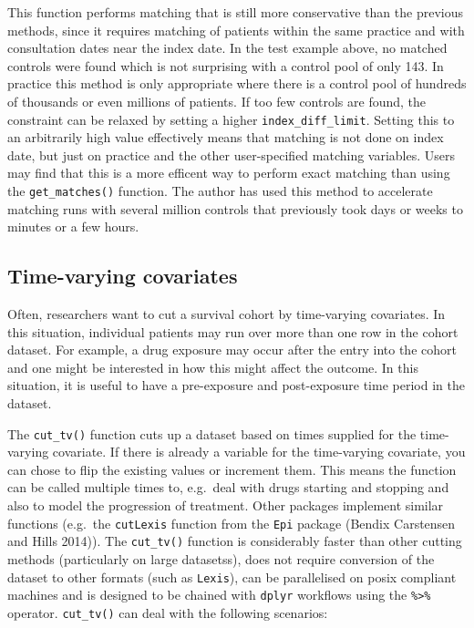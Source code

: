 \documentclass[]{article}
\begin{document}
This function performs matching that is still more conservative than the
previous methods, since it requires matching of patients within the same
practice and with consultation dates near the index date. In the test
example above, no matched controls were found which is not surprising
with a control pool of only 143. In practice this method is only
appropriate where there is a control pool of hundreds of thousands or
even millions of patients. If too few controls are found, the constraint
can be relaxed by setting a higher \texttt{index\_diff\_limit}. Setting
this to an arbitrarily high value effectively means that matching is not
done on index date, but just on practice and the other user-specified
matching variables. Users may find that this is a more efficent way to
perform exact matching than using the \texttt{get\_matches()} function.
The author has used this method to accelerate matching runs with several
million controls that previously took days or weeks to minutes or a few
hours.

\subsection{Time-varying covariates}\label{time-varying-covariates}

Often, researchers want to cut a survival cohort by time-varying
covariates. In this situation, individual patients may run over more
than one row in the cohort dataset. For example, a drug exposure may
occur after the entry into the cohort and one might be interested in how
this might affect the outcome. In this situation, it is useful to have a
pre-exposure and post-exposure time period in the dataset.

The \texttt{cut\_tv()} function cuts up a dataset based on times
supplied for the time-varying covariate. If there is already a variable
for the time-varying covariate, you can chose to flip the existing
values or increment them. This means the function can be called multiple
times to, e.g.~deal with drugs starting and stopping and also to model
the progression of treatment. Other packages implement similar functions
(e.g.~the \texttt{cutLexis} function from the \texttt{Epi} package
(Bendix Carstensen and Hills 2014)). The \texttt{cut\_tv()} function is
considerably faster than other cutting methods (particularly on large
datasetss), does not require conversion of the dataset to other formats
(such as \texttt{Lexis}), can be parallelised on posix compliant
machines and is designed to be chained with \texttt{dplyr} workflows
using the \texttt{\%\textgreater{}\%} operator. \texttt{cut\_tv()} can
deal with the following scenarios:
\end{document}
